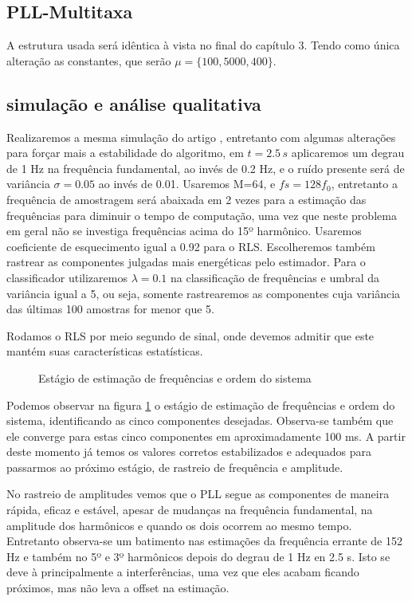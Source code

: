 \subsection{PLL-Multitaxa}
A estrutura usada será idêntica à vista no final do capítulo 3. Tendo como única alteração as constantes, que serão $\mu=\{100, 5000, 400\}$.

\subsection{simulação e análise qualitativa}
Realizaremos a mesma simulação do artigo \cite{chang2009two}, entretanto com algumas alterações para forçar mais a estabilidade do algoritmo, em $t=2.5 \, s$ aplicaremos um degrau de 1 Hz na frequência fundamental, ao invés de 0.2 Hz, e o ruído presente será de variância $\sigma=0.05$ ao invés de 0.01. Usaremos M=64, e $fs=128f_0$, entretanto a frequência de amostragem será abaixada em 2 vezes para a estimação das frequências para diminuir o tempo de computação, uma vez que neste problema em geral não se investiga frequências acima do 15º harmônico. Usaremos coeficiente de esquecimento igual a 0.92 para o RLS. Escolheremos também rastrear as componentes julgadas mais energéticas pelo estimador. Para o classificador utilizaremos $\lambda=0.1$ na classificação de frequências e umbral da variância igual a 5, ou seja, somente rastrearemos as componentes cuja variância das últimas 100 amostras for menor que 5. 

Rodamos o RLS por meio segundo de sinal, onde devemos admitir que este mantém suas características estatísticas.

\begin{figure}[H]
	\centering    
	\def\svgwidth{\columnwidth}
	
	\caption{Estágio de estimação de frequências e ordem do sistema}
	\label{fig:estagio_1}
\end{figure}

Podemos observar na figura \ref{fig:estagio_1} o estágio de estimação de frequências e ordem do sistema, identificando as cinco componentes desejadas. Observa-se também que ele converge para estas cinco componentes em aproximadamente 100 ms. A partir deste momento já temos os valores corretos estabilizados e adequados para passarmos ao próximo estágio, de rastreio de frequência e amplitude. 

\indent No rastreio de amplitudes vemos que o PLL segue as componentes de maneira rápida, eficaz e estável, apesar de mudanças na frequência fundamental, na amplitude dos harmônicos e quando os dois ocorrem ao mesmo tempo. Entretanto observa-se um batimento nas estimações da frequência errante de 152 Hz e também no 5º e 3º harmônicos depois do degrau de 1 Hz en 2.5 s. Isto se deve à principalmente a interferências, uma vez que eles acabam ficando próximos, mas não leva a offset na estimação.

